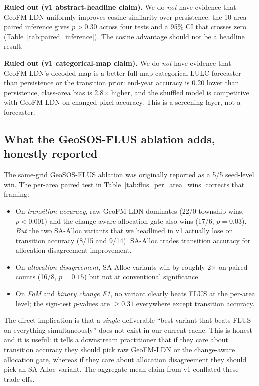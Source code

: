 \documentclass{article}
\begin{document}
\textbf{Ruled out (v1 abstract-headline claim).} We do \emph{not} have evidence that GeoFM-LDN uniformly improves cosine similarity over persistence: the 10-area paired inference gives $p>0.30$ across four tests and a 95\% CI that crosses zero (Table~\ref{tab:paired_inference}). The cosine advantage should not be a headline result.

\textbf{Ruled out (v1 categorical-map claim).} We do \emph{not} have evidence that GeoFM-LDN's decoded map is a better full-map categorical LULC forecaster than persistence or the transition prior: end-year accuracy is 0.20 lower than persistence, class-area bias is 2.8$\times$ higher, and the shuffled model is competitive with GeoFM-LDN on changed-pixel accuracy. This is a screening layer, not a forecaster.

\subsection{What the GeoSOS-FLUS ablation adds, honestly reported}

The same-grid GeoSOS-FLUS ablation was originally reported as a 5/5 seed-level win. The per-area paired test in Table~\ref{tab:flus_per_area_wins} corrects that framing:

\begin{itemize}
\item On \emph{transition accuracy}, raw GeoFM-LDN dominates (22/0 township wins, $p<0.001$) and the change-aware allocation gate also wins (17/6, $p=0.03$). \emph{But} the two SA-Alloc variants that we headlined in v1 actually lose on transition accuracy (8/15 and 9/14). SA-Alloc trades transition accuracy for allocation-disagreement improvement.
\item On \emph{allocation disagreement}, SA-Alloc variants win by roughly 2$\times$ on paired counts (16/8, $p=0.15$) but not at conventional significance.
\item On \emph{FoM} and \emph{binary change F1}, no variant clearly beats FLUS at the per-area level; the sign-test $p$-values are $\geq 0.31$ everywhere except transition accuracy.
\end{itemize}

The direct implication is that a \emph{single} deliverable ``best variant that beats FLUS on everything simultaneously'' does not exist in our current cache. This is honest and it is useful: it tells a downstream practitioner that if they care about transition accuracy they should pick raw GeoFM-LDN or the change-aware allocation gate, whereas if they care about allocation disagreement they should pick an SA-Alloc variant. The aggregate-mean claim from v1 conflated these trade-offs.
\end{document}
